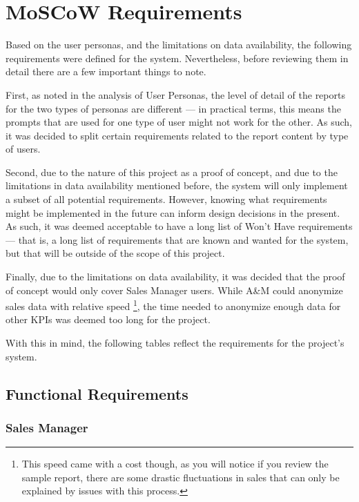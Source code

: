 \documentclass[a4paper]{report}
\begin{document}
\section{MoSCoW Requirements}


\newcommand{\frid}{FR-\arabic{frcounter}}
\newcommand{\nfrid}{NFR-\arabic{nfrcounter}}

Based on the user personas, and the limitations on data availability, the following requirements were defined for the system. Nevertheless, before reviewing them in detail there are a few important things to note.

First, as noted in the analysis of User Personas, the level of detail of the reports for the two types of personas are different --- in practical terms, this means the prompts that are used for one type of user might not work for the other. As such, it was decided to split certain requirements related to the report content by type of users.

Second, due to the nature of this project as a proof of concept, and due to the limitations in data availability mentioned before, the system will only implement a subset of all potential requirements. However, knowing what requirements might be implemented in the future can inform design decisions in the present. As such, it was deemed acceptable to have a long list of Won't Have requirements --- that is, a long list of requirements that are known and wanted for the system, but that will be outside of the scope of this project.

Finally, due to the limitations on data availability, it was decided that the proof of concept would only cover Sales Manager users. While A\&M could anonymize sales data with relative speed \footnote{This speed came with a cost though, as you will notice if you review the sample report, there are some drastic fluctuations in sales that can only be explained by issues with this process.}, the time needed to anonymize enough data for other KPIs was deemed too long for the project.

With this in mind, the following tables reflect the requirements for the project's system.
\subsection{Functional Requirements}

\subsubsection{Sales Manager}
\end{document}
